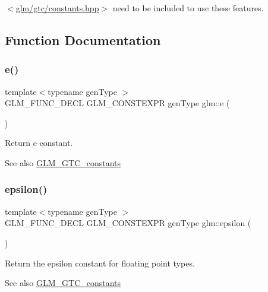 $<$\hyperlink{constants_8hpp}{glm/gtc/constants.\+hpp}$>$ need to be included to use these features. 

\subsection{Function Documentation}
\mbox{\label{group__gtc__constants_ga4b7956eb6e2fbedfc7cf2e46e85c5139}} 
\subsubsection{\texorpdfstring{e()}{e()}}
{\footnotesize\ttfamily template$<$typename gen\+Type $>$ \\
G\+L\+M\+\_\+\+F\+U\+N\+C\+\_\+\+D\+E\+CL G\+L\+M\+\_\+\+C\+O\+N\+S\+T\+E\+X\+PR gen\+Type glm\+::e (\begin{DoxyParamCaption}{ }\end{DoxyParamCaption})}

Return e constant. \begin{DoxySeeAlso}{See also}
\hyperlink{group__gtc__constants}{G\+L\+M\+\_\+\+G\+T\+C\+\_\+constants} 
\end{DoxySeeAlso}
\mbox{\label{group__gtc__constants_ga2a1e57fc5592b69cfae84174cbfc9429}} 
\subsubsection{\texorpdfstring{epsilon()}{epsilon()}}
{\footnotesize\ttfamily template$<$typename gen\+Type $>$ \\
G\+L\+M\+\_\+\+F\+U\+N\+C\+\_\+\+D\+E\+CL G\+L\+M\+\_\+\+C\+O\+N\+S\+T\+E\+X\+PR gen\+Type glm\+::epsilon (\begin{DoxyParamCaption}{ }\end{DoxyParamCaption})}

Return the epsilon constant for floating point types. \begin{DoxySeeAlso}{See also}
\hyperlink{group__gtc__constants}{G\+L\+M\+\_\+\+G\+T\+C\+\_\+constants} 
\end{DoxySeeAlso}
\mbox{\label{group__gtc__constants_gad8fe2e6f90bce9d829e9723b649fbd42}} 

